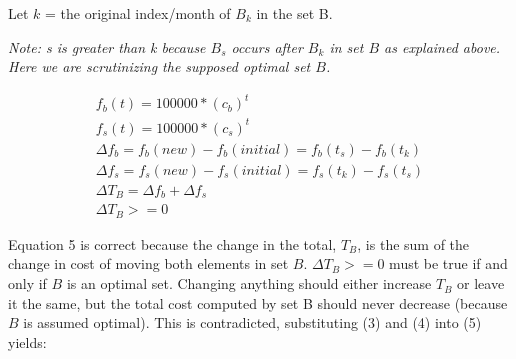 \documentclass[11pt]{article}
\begin{document}
\begin{flushleft}
\begin{enumerate}
{\begin{enumerate}
{\begin{center}
				      					      		      				      				      	Let $k$ = the original index/month of $B_k$ in the set B.
				      					      		      				      				      	
				      					      		      				      				      	\emph{Note: s is greater than k because $B_s$ occurs after $B_k$ in set $B$ as explained above. Here we are scrutinizing the supposed optimal set $B$.}
				      					      		      				      				      	
				      					      		      				      				      	
				      					      		      				      				      	\begin{eqnarray}
				      					      		      				      				      		f_b(t) = 100000*(c_b)^t \\
				      					      		      				      				      		f_s(t) = 100000*(c_s)^t \\
				      					      		      				      				      		\Delta f_b = f_b(new) - f_b(initial) = f_b(t_s) - f_b(t_k) \\
				      					      		      				      				      		\Delta f_s = f_s(new) - f_s(initial) = f_s(t_k) - f_s(t_s) \\
				      					      		      				      				      		\Delta T_B = \Delta f_b + \Delta f_s \\
				      					      		      				      				      		\Delta T_B >= 0
				      					      		      				      				      	\end{eqnarray}
				      					      		      				      				      \end{center}
				      					      		      				      				      
				      					      		      				      				      Equation 5 is correct because the change in the total, $T_B$, is the sum of the change in cost of moving both elements in set $B$. $\Delta T_B >= 0$ must be true if and only if $B$ is an optimal set. Changing anything should either increase $T_B$ or leave it the same, but the total cost computed by set B should never decrease (because $B$ is assumed optimal). This is contradicted, substituting (3) and (4) into (5) yields:
				      					      		      				      				      
}
\end{enumerate}}
\end{enumerate}
\end{flushleft}
\end{document}
